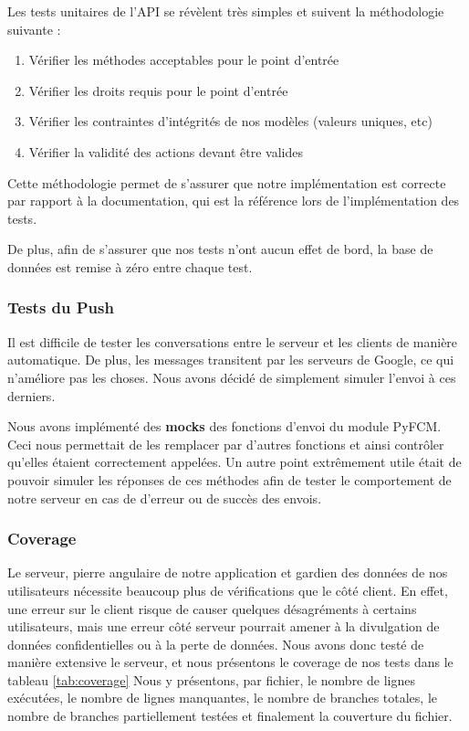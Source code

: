 \documentclass[french]{article}
\begin{document}
	Les tests unitaires de l'API se révèlent très simples et suivent la méthodologie suivante :
	
	\begin{enumerate}
		\item Vérifier les méthodes acceptables pour le point d'entrée
		\item Vérifier les droits requis pour le point d'entrée
		\item Vérifier les contraintes d'intégrités de nos modèles (valeurs uniques, etc)
		\item Vérifier la validité des actions devant être valides
	\end{enumerate}

	Cette méthodologie permet de s'assurer que notre implémentation est correcte par rapport à la documentation, qui est la référence lors de l'implémentation des tests.
	
	De plus, afin de s'assurer que nos tests n'ont aucun effet de bord, la base de données est remise à zéro entre chaque test.
	
	\subsubsection{Tests du Push}
	
	Il est difficile de tester les conversations entre le serveur et les clients de manière automatique. De plus, les messages transitent par les serveurs de Google, ce qui n'améliore pas les choses. Nous avons décidé de simplement simuler l'envoi à ces derniers.
	
	Nous avons implémenté des \textbf{mocks} des fonctions d'envoi du module PyFCM. Ceci nous permettait de les remplacer par d'autres fonctions et ainsi contrôler qu'elles étaient correctement appelées.
    Un autre point extrêmement utile était de pouvoir simuler les réponses de ces méthodes afin de tester le comportement de notre serveur en cas de d'erreur ou de succès des envois.
	
	\subsubsection{Coverage}
	
	Le serveur, pierre angulaire de notre application et gardien des données de nos utilisateurs nécessite beaucoup plus de vérifications que le côté client. En effet, une erreur sur le client risque de causer quelques désagréments à certains utilisateurs, mais une erreur côté serveur pourrait amener à la divulgation de données confidentielles ou à la perte de données. Nous avons donc testé de manière extensive le serveur, et nous présentons le coverage de nos tests dans le tableau \ref{tab:coverage} Nous y présentons, par fichier, le nombre de lignes exécutées, le nombre de lignes manquantes, le nombre de branches totales, le nombre de branches partiellement testées et finalement la couverture du fichier.
	
\end{document}
